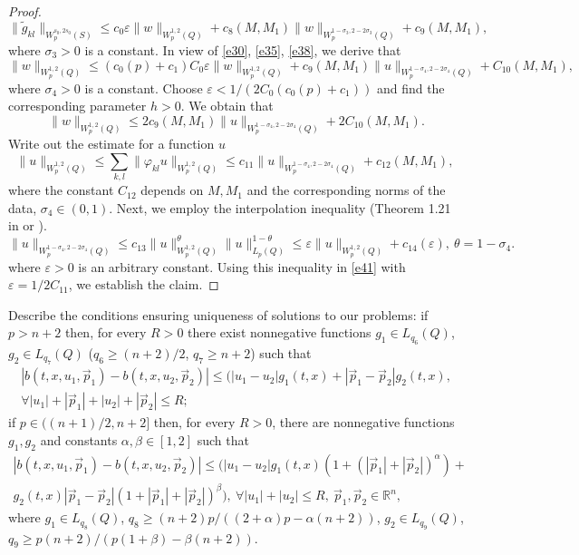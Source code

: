\documentclass{article}
\theoremstyle{plain}
\begin{document}
\begin{proof}
\begin{equation}
   \|\tilde{g}_{kl}\|_{W_p^{s_0,2s_0}(S)}\leq c_0 \varepsilon \|w\|_{W_p^{1,2}(Q)} + c_8(M,M_1)  \|w\|_{W_p^{1-\sigma_3,2-2\sigma_3}(Q)} + c_9(M,M_1),
\end{equation} 
 where $\sigma_3>0$ is a constant. In view of  \eqref{e30}, \eqref{e35}, \eqref{e38}, we derive that
  \begin{equation}\label{e39}
 \|w\|_{W_{p}^{1,2}(Q)}\leq (c_0(p)+c_1)C_0 \varepsilon \|w\|_{W_p^{1,2}(Q)} + c_9(M,M_1)  \|u\|_{W_p^{1-\sigma_4,2-2\sigma_4}(Q)}+ 
C_{10}(M,M_1), 
\end{equation}
where $\sigma_4>0$ is a constant. Choose   $\varepsilon<1/(2C_0(c_0(p)+c_1))$ and find the corresponding parameter  $h>0$.  We obtain that 
\begin{equation}\label{e40}
 \|w\|_{W_{p}^{1,2}(Q)}\leq  2c_9(M,M_1)  \|u\|_{W_p^{1-\sigma_4,2-2\sigma_4}(Q)}+ 
2 C_{10}(M,M_1). 
\end{equation}
Write out the estimate for a function  $u$
\begin{equation}\label{e41}
 \|u\|_{W_{p}^{1,2}(Q)}\leq \sum_{k,l} \|\varphi_{kl}u\|_{W_{p}^{1,2}(Q)} \leq 
 c_{11}  \|u\|_{W_p^{1-\sigma_4,2-2\sigma_4}(Q)}+ 
 c_{12}(M,M_1),\  
\end{equation}
where the constant  $C_{12}$ depends on  $M,M_1$ and the corresponding norms of the data, $\sigma_4\in (0,1)$.
Next, we employ the interpolation inequality  (Theorem  1.21 in \cite{pya11} or \cite{ama}).
$$
\|u\|_{W_p^{1-\sigma_4,2-2\sigma_4}(Q)}\leq c_{13} \|u\|_{W_p^{1,2}(Q)}^{\theta}\|u\|_{L_p(Q)}^{1-\theta}\leq 
\varepsilon \|u\|_{W_p^{1,2}(Q)}+ c_{14}(\varepsilon),\ 
 \theta=1-\sigma_4.
 $$
where $\varepsilon >0$ is an arbitrary constant. Using this inequality in  \eqref{e41} with  $\varepsilon=1/2C_{11} $, we establish the claim. 
 \end{proof}


Describe the conditions ensuring uniqueness of solutions to our problems: if  $p>n+2$ then, for every  $R>0$ there exist 
nonnegative functions  $g_1\in L_{q_6}(Q)$, $g_2\in L_{q_7}(Q)$ ($q_6\geq (n+2)/2$,
$q_7\geq n+2$) such that 
\begin{multline}\label{e42}
 |b(t,x,u_1,\vec{p}_1)-b(t,x,u_2,\vec{p}_2)|\leq (|u_1-u_2|g_1(t,x) + |\vec{p}_1-\vec{p}_2|g_2(t,x), \\  \forall |u_1|+|\vec{p}_1|+|u_2|+|\vec{p}_2|\leq R;  
\end{multline}
if  $p\in ((n+1)/2, n+2]$ then, for every  $R>0$, there are nonnegative functions  $g_1,g_2$ and constants  $\alpha,\beta\in [1,2]$ such that 
\begin{multline}\label{e421}
 |b(t,x,u_1,\vec{p}_1)-b(t,x,u_2,\vec{p}_2)|\leq (|u_1-u_2|g_1(t,x)(1+(|\vec{p}_1| +|\vec{p}_2|)^\alpha)+\\  g_2(t,x) |\vec{p}_1-\vec{p}_2| (1+ |\vec{p}_1| +|\vec{p}_2|)^\beta), \  \forall |u_1|+|u_2|\leq R,  \ \vec{p}_1,\vec{p}_2\in {\mathbb R}^n,
\end{multline}
where $g_1\in L_{q_8}(Q)$, $q_8\geq (n+2)p/((2+\alpha)p-\alpha(n+2))$, $g_2\in L_{q_9}(Q)$,  $q_9\geq p(n+2)/(p(1+\beta)-\beta (n+2))$. 
\end{document}
